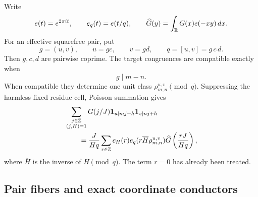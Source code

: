 Write
\begin{equation}
 e(t)=e^{2\pi it},\qquad e_q(t)=e(t/q),\qquad
 \widehat G(y)=\int_\mathbb R G(x)e(-xy)\,dx.
 \label{eq:tpc28-Fourier-conventions}
\end{equation}
For an effective squarefree pair, put
\begin{equation}
 g=(u,v),\qquad u=gc,\qquad v=gd,\qquad
 q=[u,v]=g\,c\,d.
 \label{eq:tpc28-gcd-coordinates}
\end{equation}
Then $g,c,d$ are pairwise coprime.  The target congruences are
compatible exactly when
\begin{equation}
 g\mid m-n.
 \label{eq:tpc28-compatibility}
\end{equation}
When compatible they determine one unit class
\(\rho_{m,n}^{u,v}\pmod q\).  Suppressing the harmless fixed residue
cell, Poisson summation gives
\begin{align}
 &\sum_{\substack{j\in\mathbb Z\\(j,H)=1}}
 G(j/J)\mathbf 1_{u\mid mj+h}\mathbf 1_{v\mid nj+h}
 \notag\\
 &\qquad=
 \frac{J}{Hq}\sum_{r\in\mathbb Z}c_H(r)
 e_q(r\overline H\rho_{m,n}^{u,v})
 \widehat G\left(\frac{rJ}{Hq}\right),
 \label{eq:tpc28-joint-Poisson}
\end{align}
where $\overline H$ is the inverse of $H\pmod q$.  The term $r=0$
has already been treated.

\subsection{Pair fibers and exact coordinate conductors}

